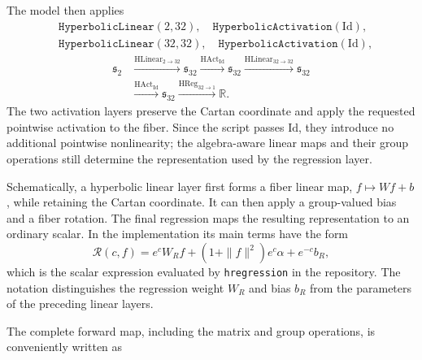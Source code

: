 \documentclass[10pt]{article}
\begin{document}
The model then applies
\begin{equation}
\begin{split}
 &\texttt{HyperbolicLinear}(2,32),\quad
   \texttt{HyperbolicActivation}(\mathrm{Id}),\\
 &\texttt{HyperbolicLinear}(32,32),\quad
   \texttt{HyperbolicActivation}(\mathrm{Id}),
\end{split}
\end{equation}
\begin{equation}
\scriptstyle
\begin{aligned}
 \mathfrak{s}_{2}
 &\xrightarrow{\mathrm{HLinear}_{2\to32}} \mathfrak{s}_{32}
  \xrightarrow{\mathrm{HAct}_{\mathrm{Id}}} \mathfrak{s}_{32}
  \xrightarrow{\mathrm{HLinear}_{32\to32}} \mathfrak{s}_{32} \\
 &\xrightarrow{\mathrm{HAct}_{\mathrm{Id}}} \mathfrak{s}_{32}
  \xrightarrow{\mathrm{HReg}_{32\to1}} \mathbb{R}.
\end{aligned}
\end{equation}
The two activation layers
preserve the Cartan coordinate and apply the requested pointwise activation to
the fiber.  Since the script passes \(\mathrm{Id}\), they introduce no
additional pointwise nonlinearity; the algebra-aware linear maps and their
group operations still determine the representation used by the regression
layer.

\noindent{}

Schematically, a hyperbolic linear layer first forms a fiber linear map,
\(f\mapsto Wf+b\), while retaining the Cartan coordinate.  It can then apply
a group-valued bias and a fiber rotation.  The final regression maps the
resulting representation to an ordinary scalar.  In the implementation its
main terms have the form
\begin{equation}
 \mathcal R(c,f)=e^c W_Rf+(1+\|f\|^2)e^c\alpha+e^{-c}b_R,
\end{equation}
which is the scalar expression evaluated by \texttt{hregression} in the
repository.  The notation distinguishes the regression weight \(W_R\) and
bias \(b_R\) from the parameters of the preceding linear layers.

The complete forward map, including the matrix and group operations, is
conveniently written as
\end{document}
